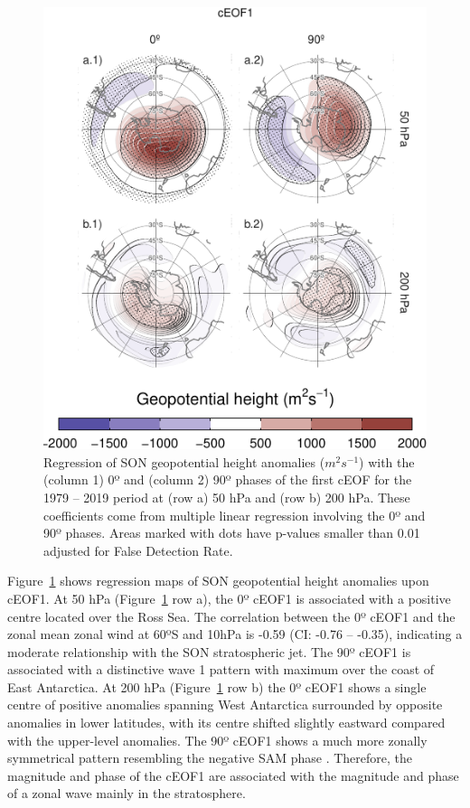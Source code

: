\documentclass[pdflatex,lineno,sn-basic]{sn-jnl}
\theoremstyle{thmstyleone}%
\theoremstyle{thmstyletwo}%
\theoremstyle{thmstylethree}%
\begin{document}
\begin{figure}
\centering
\includegraphics{shceof_files/figure-latex/eof1-regr-gh-1.pdf}
\caption{\label{fig:eof1-regr-gh}Regression of SON geopotential height anomalies (\(m^2s^{-1}\)) with the (column 1) 0º and (column 2) 90º phases of the first cEOF for the 1979 -- 2019 period at (row a) 50 hPa and (row b) 200 hPa. These coefficients come from multiple linear regression involving the 0º and 90º phases. Areas marked with dots have p-values smaller than 0.01 adjusted for False Detection Rate.}
\end{figure}

Figure~\ref{fig:eof1-regr-gh} shows regression maps of SON geopotential height anomalies upon cEOF1.
At 50 hPa (Figure~\ref{fig:eof1-regr-gh} row a), the 0º cEOF1 is associated with a positive centre located over the Ross Sea.
The correlation between the 0º cEOF1 and the zonal mean zonal wind at 60ºS and 10hPa is -0.59 (CI: -0.76 -- -0.35), indicating a moderate relationship with the SON stratospheric jet.
The 90º cEOF1 is associated with a distinctive wave 1 pattern with maximum over the coast of East Antarctica.
At 200 hPa (Figure~\ref{fig:eof1-regr-gh} row b) the 0º cEOF1 shows a single centre of positive anomalies spanning West Antarctica surrounded by opposite anomalies in lower latitudes, with its centre shifted slightly eastward compared with the upper-level anomalies.
The 90º cEOF1 shows a much more zonally symmetrical pattern resembling the negative SAM phase \citep[e.g.][]{fogt2020}.
Therefore, the magnitude and phase of the cEOF1 are associated with the magnitude and phase of a zonal wave mainly in the stratosphere.
\end{document}

